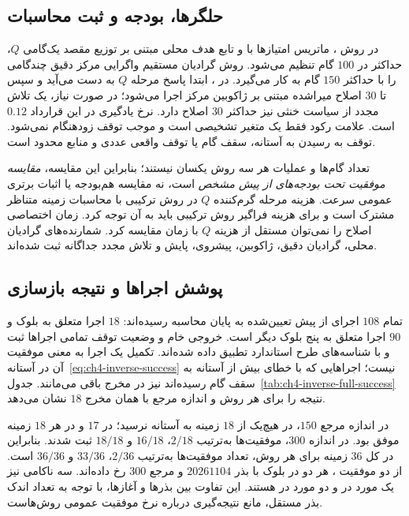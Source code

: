 \subsection{حلگرها، بودجه و ثبت محاسبات}
\label{subsec:ch4-inverse-algorithms}
در روش ، ماتریس امتیازها با  و تابع هدف محلی مبتنی بر توزیع مقصد یک‌گامی $Q$، حداکثر در $100$ گام تنظیم می‌شود. روش  گرادیان مستقیم واگرایی مرکز دقیق چندگامی را با حداکثر $150$ گام به کار می‌گیرد. در ، ابتدا پاسخ مرحله $Q$ به دست می‌آید و سپس تا $30$ اصلاح میراشده مبتنی بر ژاکوبین مرکز اجرا می‌شود؛ در صورت نیاز، یک تلاش مجدد از سیاست خنثی نیز حداکثر $30$ اصلاح دارد. نرخ یادگیری  در این قرارداد $0.12$ است. علامت رکود فقط یک متغیر تشخیصی است و موجب توقف زودهنگام نمی‌شود. توقف به رسیدن به آستانه، سقف گام یا توقف واقعی عددی و منابع محدود است.

تعداد گام‌ها و عملیات هر سه روش یکسان نیستند؛ بنابراین این مقایسه، \emph{مقایسه موفقیت تحت بودجه‌های از پیش مشخص} است، نه مقایسه هم‌بودجه یا اثبات برتری عمومی سرعت. هزینه مرحله گرم‌کننده $Q$ در روش ترکیبی با محاسبات زمینه متناظر مشترک است و برای هزینه فراگیر روش ترکیبی باید به آن توجه کرد. زمان اختصاصی اصلاح  را نمی‌توان مستقل از هزینه $Q$ با زمان  مقایسه کرد. شمارنده‌های گرادیان محلی، گرادیان دقیق، ژاکوبین، پیشروی، پایش و تلاش مجدد جداگانه ثبت شده‌اند.

\subsection{پوشش اجراها و نتیجه بازسازی}
\label{subsec:ch4-inverse-b01v2-results}
تمام $108$ اجرای از پیش تعیین‌شده به پایان محاسبه رسیده‌اند: $18$ اجرا متعلق به بلوک  و $90$ اجرا متعلق به پنج بلوک دیگر است. خروجی خام و وضعیت توقف تمامی اجراها ثبت و با شناسه‌های طرح استاندارد تطبیق داده شده‌اند. تکمیل یک اجرا به معنی موفقیت آن در آستانه~\eqref{eq:ch4-inverse-success} نیست؛ اجراهایی که با خطای بیش از آستانه به سقف گام رسیده‌اند نیز در مخرج باقی می‌مانند. جدول~\ref{tab:ch4-inverse-full-success} نتیجه را برای هر روش و اندازه مرجع با همان مخرج $18$ نشان می‌دهد.



در اندازه مرجع $150$،  در هیچ‌یک از $18$ زمینه به آستانه نرسید؛  در $17$ و  در هر $18$ زمینه موفق بود. در اندازه $300$، موفقیت‌ها به‌ترتیب $2/18$، $16/18$ و $18/18$ ثبت شدند. بنابراین در کل $36$ زمینه برای هر روش، تعداد موفقیت‌ها به‌ترتیب $2/36$، $33/36$ و $36/36$ است. از دو موفقیت ، هر دو در بلوک  با بذر $20261104$ و مرجع $300$ رخ داده‌اند. سه ناکامی  نیز یک مورد در  و دو مورد در  هستند. این تفاوت بین بذرها و آغازها، با توجه به تعداد اندک بذر مستقل، مانع نتیجه‌گیری درباره نرخ موفقیت عمومی روش‌هاست.

